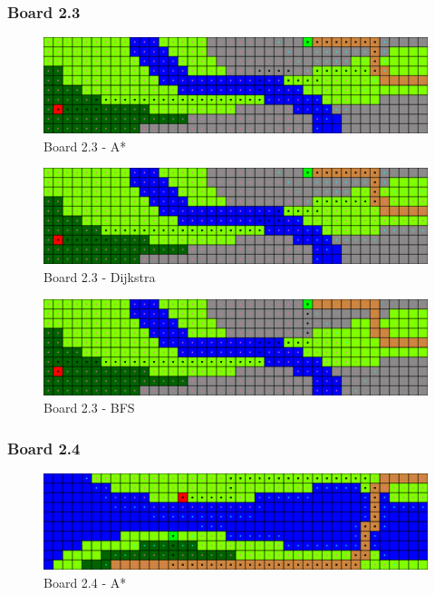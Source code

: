 \newpage

\subsubsection*{Board 2.3}

\begin{figure}[h!]
  \centering
    \includegraphics[width=\textwidth]{img/board-2-3-astar}
    \caption{Board 2.3 - A*}
\end{figure}

\begin{figure}[h!]
  \centering
    \includegraphics[width=\textwidth]{img/board-2-3-dijkstra}
    \caption{Board 2.3 - Dijkstra}
\end{figure}

\begin{figure}[h!]
  \centering
    \includegraphics[width=\textwidth]{img/board-2-3-bfs}
    \caption{Board 2.3 - BFS}
\end{figure}


\newpage

\subsubsection*{Board 2.4}

\begin{figure}[h!]
  \centering
    \includegraphics[width=\textwidth]{img/board-2-4-astar}
    \caption{Board 2.4 - A*}
\end{figure}


